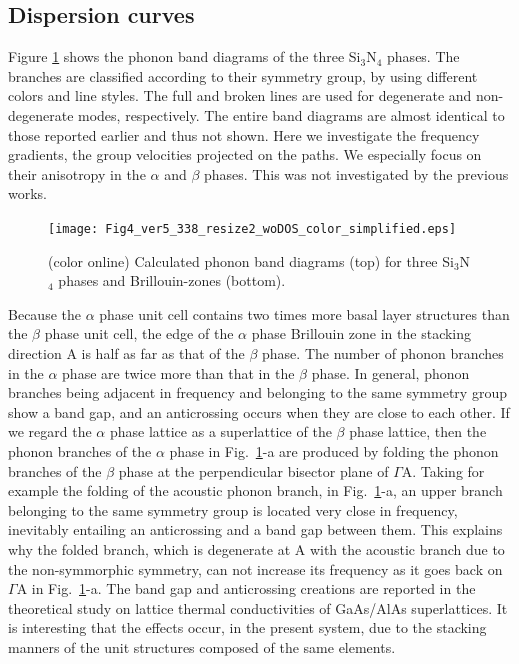 \documentclass[twocolumn,amsmath,amssymb,a4paper,prb,superscriptaddress,floatfix]{revtex4-1}
\begin{document}
\subsection{Dispersion curves}

Figure \ref{fig:Fig4_ver5_338} shows the phonon band diagrams of the three
Si$_3$N$_4$ phases. The branches are classified according to their symmetry
group, by using different colors and line styles. The full and broken lines are
used for degenerate and non-degenerate modes, respectively. The entire band
diagrams are almost identical to those reported earlier\cite{kuwabara,xu} and
thus not shown.  Here we investigate the frequency gradients, the
group velocities projected on the paths. We especially focus on
their anisotropy in the $\alpha$ and $\beta$ phases. This was not investigated
by the previous works.

\begin{figure}[ht]
 \begin{center}
  \texttt{[image: Fig4\_ver5\_338\_resize2\_woDOS\_color\_simplified.eps]}
    \caption{(color online) Calculated phonon band
		      diagrams (top) for three Si$_3$N$_4$ phases and Brillouin-zones (bottom).
  \label{fig:Fig4_ver5_338} }
 \end{center}
\end{figure}

Because the $\alpha$ phase unit cell contains two times more basal layer
structures than the $\beta$ phase unit cell, the edge of the $\alpha$ phase
Brillouin zone in the stacking direction A is half as far as that of the $\beta$
phase. The number of phonon branches in the $\alpha$ phase are twice more than
that in the $\beta$ phase. In general, phonon branches being adjacent in
frequency and belonging to the same symmetry group show a band gap, and an
anticrossing occurs when they are close to each other. If we regard the $\alpha$ phase
lattice as a superlattice of the $\beta$ phase lattice, then the phonon branches
of the $\alpha$ phase in Fig.~\ref{fig:Fig4_ver5_338}-a are produced by folding
the phonon branches of the $\beta$ phase at the perpendicular bisector plane of
$\Gamma$A. Taking for example the folding of the acoustic phonon branch, in
Fig.~\ref{fig:Fig4_ver5_338}-a, an upper branch belonging to the same symmetry
group is located very close in frequency, inevitably entailing an anticrossing
and a band gap between them. This explains why the folded branch, which is
degenerate at A with the acoustic branch due to the non-symmorphic symmetry, can
not increase its frequency as it goes back on $\Gamma$A in
Fig.~\ref{fig:Fig4_ver5_338}-a.  The band gap and anticrossing creations are
reported in the theoretical study on lattice thermal conductivities of GaAs/AlAs
superlattices.\cite{GaAs/AlAs} It is interesting that the effects occur, in the
present system, due to the stacking manners of the unit structures composed of
the same elements.
\end{document}
